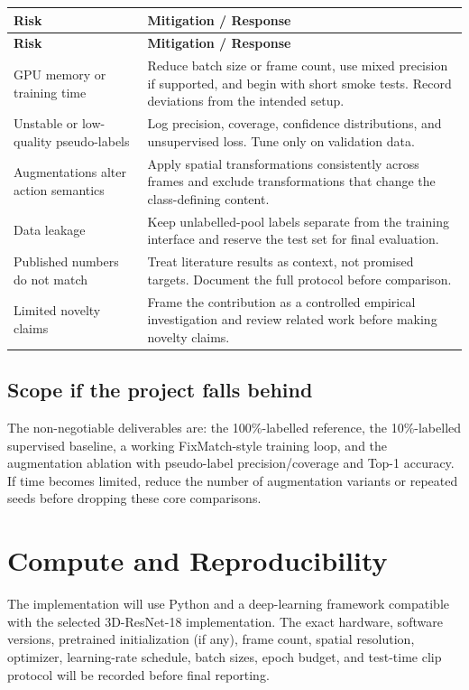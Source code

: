 \documentclass[11pt,a4paper]{article}
\begin{document}
\begin{longtable}{L{0.25\textwidth}L{0.69\textwidth}}
\toprule
\textbf{Risk} & \textbf{Mitigation / Response} \\
\midrule
\endfirsthead
\toprule
\textbf{Risk} & \textbf{Mitigation / Response} \\
\midrule
\endhead
GPU memory or training time & Reduce batch size or frame count, use mixed precision if supported, and begin with short smoke tests. Record deviations from the intended setup. \\
Unstable or low-quality pseudo-labels & Log precision, coverage, confidence distributions, and unsupervised loss. Tune only on validation data. \\
Augmentations alter action semantics & Apply spatial transformations consistently across frames and exclude transformations that change the class-defining content. \\
Data leakage & Keep unlabelled-pool labels separate from the training interface and reserve the test set for final evaluation. \\
Published numbers do not match & Treat literature results as context, not promised targets. Document the full protocol before comparison. \\
Limited novelty claims & Frame the contribution as a controlled empirical investigation and review related work before making novelty claims. \\
\bottomrule
\end{longtable}


\subsection{Scope if the project falls behind}
The non-negotiable deliverables are: the 100\%-labelled reference, the 10\%-labelled supervised baseline, a working FixMatch-style training loop, and the augmentation ablation with pseudo-label precision/coverage and Top-1 accuracy. If time becomes limited, reduce the number of augmentation variants or repeated seeds before dropping these core comparisons.

\newpage
\section{Compute and Reproducibility}
The implementation will use Python and a deep-learning framework compatible with the selected 3D-ResNet-18 implementation. The exact hardware, software versions, pretrained initialization (if any), frame count, spatial resolution, optimizer, learning-rate schedule, batch sizes, epoch budget, and test-time clip protocol will be recorded before final reporting.
\end{document}
